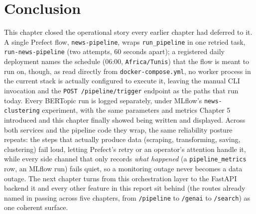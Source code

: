 \section{Conclusion}
\begin{sloppypar}
This chapter closed the operational story every earlier chapter had deferred to it. A single Prefect flow, \texttt{news-pipeline}, wraps \texttt{run\_pipeline} in one retried task, \texttt{run-news-pipeline} (two attempts, 60 seconds apart); a registered daily deployment names the schedule (06:00, \texttt{Africa/Tunis}) that the flow is meant to run on, though, as read directly from \texttt{docker-compose.yml}, no worker process in the current stack is actually configured to execute it, leaving the manual CLI invocation and the \texttt{POST /pipeline/trigger} endpoint as the paths that run today. Every BERTopic run is logged separately, under MLflow's \texttt{news-clustering} experiment, with the same parameters and metrics Chapter 5 introduced and this chapter finally showed being written and displayed. Across both services and the pipeline code they wrap, the same reliability posture repeats: the steps that actually produce data (scraping, transforming, saving, clustering) fail loud, letting Prefect's retry or an operator's attention handle it, while every side channel that only records \emph{what happened} (a \texttt{pipeline\_metrics} row, an MLflow run) fails quiet, so a monitoring outage never becomes a data outage. The next chapter turns from this orchestration layer to the FastAPI backend it and every other feature in this report sit behind (the routes already named in passing across five chapters, from \texttt{/pipeline} to \texttt{/genai} to \texttt{/search}) as one coherent surface.
\end{sloppypar}
